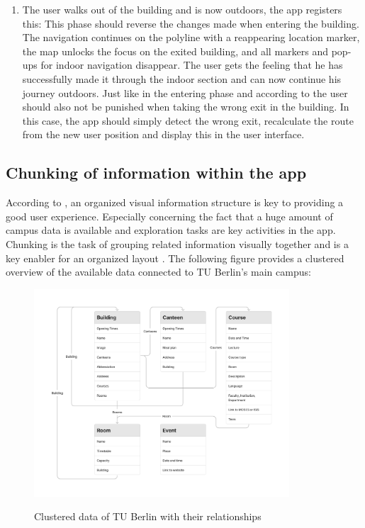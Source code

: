 \begin{enumerate}
    \item The user walks out of the building and is now outdoors, the app registers this: This phase should reverse the changes made when entering the building. The navigation continues on the polyline with a reappearing location marker, the map unlocks the focus on the exited building, and all markers and pop-ups for indoor navigation disappear. The user gets the feeling that he has successfully made it through the indoor section and can now continue his journey outdoors. Just like in the entering phase and according to \cite{postels_law} the user should also not be punished when taking the wrong exit in the building. In this case, the app should simply detect the wrong exit, recalculate the route from the new user position and display this in the user interface.
\end{enumerate}


\newpage

\subsection{Chunking of information within the app}
According to \cite{millers_law}, an organized visual information structure is key to providing a good user experience. Especially concerning the fact that a huge amount of campus data is available and exploration tasks are key activities in the app. Chunking is the task of grouping related information visually together and is a key enabler for an organized layout \cite{millers_law}. The following figure provides a clustered overview of the available data connected to TU Berlin's main campus:

\begin{figure}[H]
	\centering
	\includegraphics[width=0.85\textwidth]{images/information_cluster.png}\\
	\caption{Clustered data of TU Berlin with their relationships}
\end{figure}

